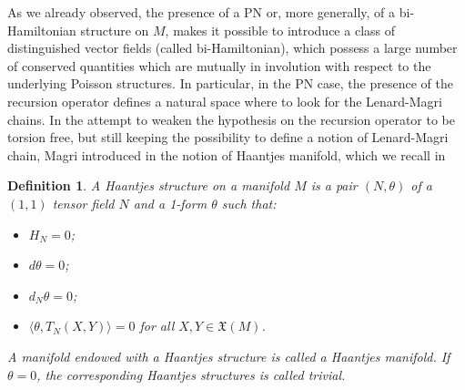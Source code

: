 \documentclass[12pt]{article}
\newtheorem{defi}[theorem]{Definition}
\begin{document}
As we already observed, the presence of a PN or, more generally, of a bi-Hamiltonian structure on $M$, makes it possible to introduce a class of distinguished vector fields (called bi-Hamiltonian), which possess a large number of conserved quantities which are mutually in involution with respect to the underlying Poisson structures. In particular, in the PN case, the presence of the recursion operator defines a natural space where to look for the Lenard-Magri chains. In the attempt to weaken the hypothesis on the recursion operator to be torsion free, but still keeping the possibility to define a notion of Lenard-Magri chain, Magri introduced in \cite{MagriHaa} the notion of Haantjes manifold, which we recall in %

\begin{defi} A Haantjes structure on a manifold $M$ is a pair $(N,\theta)$ of a $(1,1)$ tensor field $N$ 
and a 1-form $\theta$ such that:
\begin{itemize}
\item[(H1)] $H_N=0$;
\item[(H2)] $d\theta=0$;
\item[(H3)] $d_N\theta=0$;
\item[(H4)] $\langle\theta,T_N(X,Y)\rangle=0$ for all $X,Y\in\mathfrak X(M)$.
\end{itemize}
A manifold endowed with a Haantjes structure is called a Haantjes manifold. If $\theta=0$, the corresponding Haantjes structures is called trivial.
\end{defi}
\end{document}
